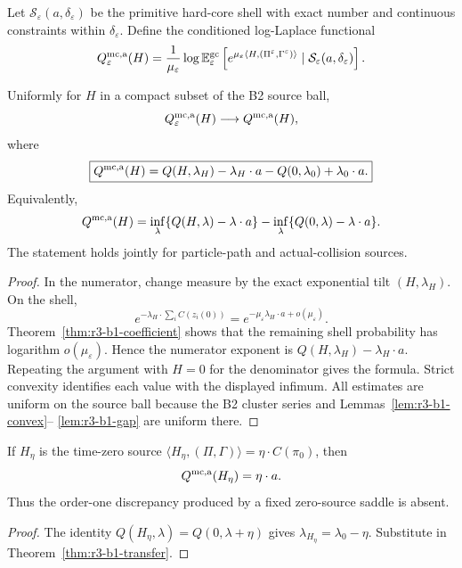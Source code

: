 Let \(\mathcal S_\varepsilon(a,\delta_\varepsilon)\) be the primitive
hard-core shell with exact number and continuous constraints within
\(\delta_\varepsilon\).  Define the conditioned log-Laplace functional
\[
 Q_\varepsilon^{\rm mc,a}(H)
 =\frac1{\mu_\varepsilon}
 \log\mathbb E_\varepsilon^{\rm gc}
 \left[
 e^{\mu_\varepsilon\langle H,(\Pi^\varepsilon,
 \Gamma^\varepsilon)\rangle}
 \mid\mathcal S_\varepsilon(a,\delta_\varepsilon)
 \right].
\]

\begin{theorem}
\label{thm:r3-b1-transfer}
Uniformly for \(H\) in a compact subset of the B2 source ball,
\[
 Q_\varepsilon^{\rm mc,a}(H)
 \longrightarrow
 Q^{\rm mc,a}(H),
\]
where
\[
 \boxed{
 Q^{\rm mc,a}(H)
 =Q(H,\lambda_H)-\lambda_H\cdot a
 -Q(0,\lambda_0)+\lambda_0\cdot a.}
\]
Equivalently,
\[
 Q^{\rm mc,a}(H)
 =\inf_\lambda\{Q(H,\lambda)-\lambda\cdot a\}
 -\inf_\lambda\{Q(0,\lambda)-\lambda\cdot a\}.
\]
The statement holds jointly for particle-path and actual-collision sources.
\end{theorem}

\begin{proof}
In the numerator, change measure by the exact exponential tilt
\((H,\lambda_H)\).  On the shell,
\[
 e^{-\lambda_H\cdot\sum_iC(z_i(0))}
 =e^{-\mu_\varepsilon\lambda_H\cdot a+o(\mu_\varepsilon)}.
\]
Theorem~\ref{thm:r3-b1-coefficient} shows that the remaining shell probability
has logarithm \(o(\mu_\varepsilon)\).  Hence the numerator exponent is
\(Q(H,\lambda_H)-\lambda_H\cdot a\).  Repeating the argument with \(H=0\)
for the denominator gives the formula.  Strict convexity identifies each
value with the displayed infimum.  All estimates are uniform on the source
ball because the B2 cluster series and Lemmas~\ref{lem:r3-b1-convex}--
\ref{lem:r3-b1-gap} are uniform there.
\end{proof}

\begin{proposition}
\label{prop:r3-b1-timezero}
If \(H_\eta\) is the time-zero source
\(\langle H_\eta,(\Pi,\Gamma)\rangle=\eta\cdot C(\pi_0)\), then
\[
 Q^{\rm mc,a}(H_\eta)=\eta\cdot a.
\]
Thus the order-one discrepancy produced by a fixed zero-source saddle is
absent.
\end{proposition}

\begin{proof}
The identity
\(Q(H_\eta,\lambda)=Q(0,\lambda+\eta)\) gives
\(\lambda_{H_\eta}=\lambda_0-\eta\).  Substitute in
Theorem~\ref{thm:r3-b1-transfer}.
\end{proof}

